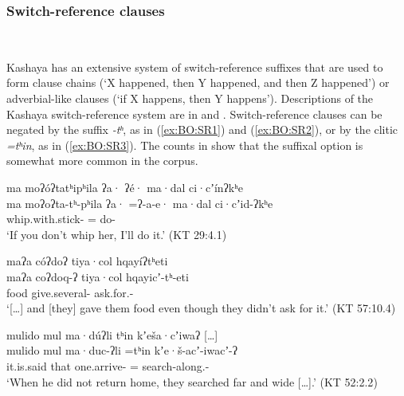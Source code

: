 \documentclass[output=paper,modfonts,nonflat,colorlinks,citecolor=brown]{langscibook}
\begin{document}
\subsubsection{Switch-reference clauses}
\label{sec:BO:SR}
~\\[-2em]

\noindent
\parbox{\textwidth}{%
Kashaya has an extensive system of switch-reference suffixes that are used to form clause chains (`X happened, then Y happened, and then Z happened') or  adverbial-like clauses (`if X happens, then Y happens'). Descriptions of the Kashaya switch-reference system are in \citet{Oswalt1961,Oswalt1983} and \citet[35--44]{Olsson2010}. Switch-reference clauses can be negated by the suffix \textit{-tʰ}, as in (\ref{ex:BO:SR1}) and (\ref{ex:BO:SR2}), or by the clitic \textit{=tʰin}, as in (\ref{ex:BO:SR3}). The counts in  show that the suffixal option is somewhat more common in the corpus.}


{%
\ea 
\label{ex:BO:SR1}
\glll ma moʔóʔtatʰipʰila ʔa· ʔé· ma·dal ci·cʼínʔkʰe\\
     ma moʔoʔta-tʰ-pʰila ʔa· =ʔ-a-e· ma·dal ci·cʼid-ʔkʰe\\
      whip.with.stick-  =  do-\\
\glt `If you don’t whip her, I’ll do it.' ({KT 29:4.1})\\
\z
}%

{%
\ea 
\label{ex:BO:SR2}
\glll {\ldots} maʔa cóʔdoʔ tiya·col hqayíʔtʰeti\\
    {} maʔa coʔdoq-ʔ tiya·col hqayicʼ-tʰ-eti\\
    {} food give.several-  ask.for.-\\
\glt `[\ldots] and [they] gave them food even though they didn’t ask for it.' ({KT 57:10.4})\\
\z
}%

\ea 
\label{ex:BO:SR3}
\glll mulido mul ma·dúʔli tʰin kʼeša·cʼiwaʔ [\ldots]\\
    mulido mul ma·duc-ʔli =tʰin kʼe·š-acʼ-iwacʼ-ʔ {}\\
    it.is.said that one.arrive- = search-along.- {}\\
\glt `When he did not return home, they searched far and wide [\ldots].' ({KT 52:2.2})\\
\z
\end{document}
